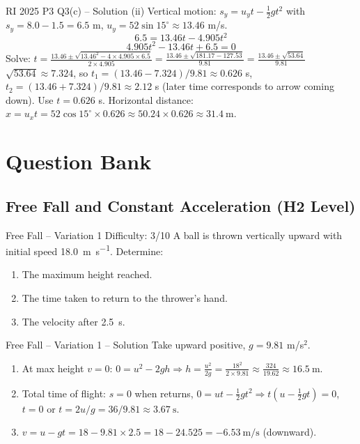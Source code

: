 \documentclass{beamer}
\begin{document}
\begin{frame}[shrink=15]{RI 2025 P3 Q3(c) – Solution (ii)}
Vertical motion: $s_y = u_y t - \frac12 g t^2$ with $s_y = 8.0 - 1.5 = 6.5$ m, $u_y = 52\sin15^\circ \approx 13.46$ m/s.
\[ 6.5 = 13.46 t - 4.905 t^2 \]
\[ 4.905 t^2 - 13.46 t + 6.5 = 0 \]
Solve: $t = \frac{13.46 \pm \sqrt{13.46^2 - 4\times4.905\times6.5}}{2\times4.905} = \frac{13.46 \pm \sqrt{181.17 - 127.53}}{9.81} = \frac{13.46 \pm \sqrt{53.64}}{9.81}$
$\sqrt{53.64} \approx 7.324$, so $t_1 = (13.46-7.324)/9.81 \approx 0.626$ s, $t_2 = (13.46+7.324)/9.81 \approx 2.12$ s (later time corresponds to arrow coming down). Use $t=0.626$ s.
Horizontal distance: $x = u_x t = 52\cos15^\circ \times 0.626 \approx 50.24\times0.626 \approx \SI{31.4}{\m}$.
\end{frame}

\section{Question Bank}


\subsection{Free Fall and Constant Acceleration (H2 Level)}
\begin{frame}[t,shrink=15]{Free Fall – Variation 1 \hfill Difficulty: 3/10}
A ball is thrown vertically upward with initial speed \SI{18.0}{\meter\per\second}. Determine:
\begin{enumerate}
    \item The maximum height reached.
    \item The time taken to return to the thrower's hand.
    \item The velocity after \SI{2.5}{\second}.
\end{enumerate}
\end{frame}

\begin{frame}[shrink=15]{Free Fall – Variation 1 – Solution}
Take upward positive, $g = 9.81$ m/s$^2$.
\begin{enumerate}
    \item At max height $v=0$: $0 = u^2 - 2g h \Rightarrow h = \frac{u^2}{2g} = \frac{18^2}{2\times9.81} \approx \frac{324}{19.62} \approx \SI{16.5}{\meter}$.
    \item Total time of flight: $s=0$ when returns, $0 = ut - \frac12 g t^2 \Rightarrow t( u - \frac12 g t) = 0$, $t=0$ or $t = 2u/g = 36/9.81 \approx \SI{3.67}{\second}$.
    \item $v = u - g t = 18 - 9.81\times2.5 = 18 - 24.525 = \SI{-6.53}{\meter\per\second}$ (downward).
\end{enumerate}
\end{frame}
\end{document}
